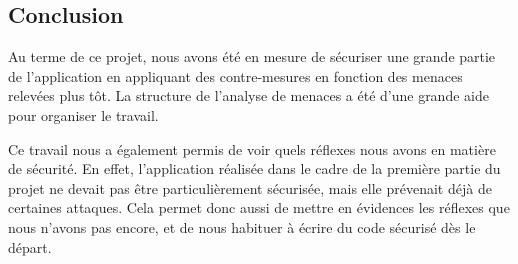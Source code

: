 \documentclass{article}
\begin{document}
\subsection{Conclusion}

Au terme de ce projet, nous avons été en mesure de sécuriser une grande
partie de l'application en appliquant des contre-mesures en fonction des
menaces relevées plus tôt. La structure de l'analyse de menaces a été
d'une grande aide pour organiser le travail.

Ce travail nous a également permis de voir quels réflexes nous avons en
matière de sécurité. En effet, l'application réalisée dans le cadre de
la première partie du projet ne devait pas être particulièrement
sécurisée, mais elle prévenait déjà de certaines attaques. Cela permet
donc aussi de mettre en évidences les réflexes que nous n'avons pas
encore, et de nous habituer à écrire du code sécurisé dès le départ.
\end{document}

